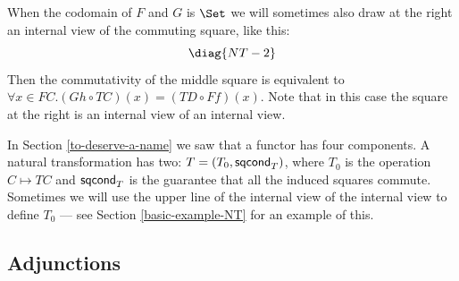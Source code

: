 \documentclass[oneside,12pt]{article}
\begin{document}
When the codomain of $F$ and $G$ is $\Set$ we will sometimes also draw
at the right an internal view of the commuting square, like this:
%
$$\pu
  \diag{NT-2}
$$
%
Then the commutativity of the middle square is equivalent to
$∀x∈FC.(Gh∘TC)(x)=(TD∘Ff)(x)$. Note that in this case the square at
the right is an internal view of an internal view.

In Section \ref{to-deserve-a-name} we saw that a functor has four
components. A natural transformation has two: $T=(T_0, \mathsf{sqcond}_T)$,
where $T_0$ is the operation $C \mapsto TC$ and $\mathsf{sqcond}_T$ is the
guarantee that all the induced squares commute. Sometimes we will use
the upper line of the internal view of the internal view to define
$T_0$ --- see Section \ref{basic-example-NT} for an example of this.






%
\subsection{Adjunctions \DONE}
\label{internal-view-adjunction}

\end{document}
